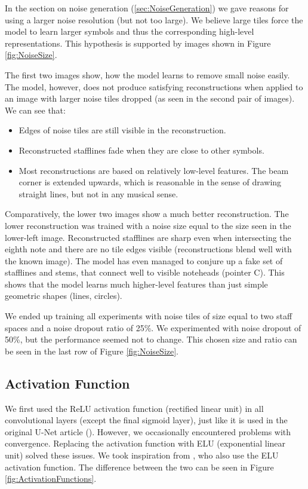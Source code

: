 In the section on noise generation (\ref{sec:NoiseGeneration}) we gave reasons for using a larger noise resolution (but not too large). We believe large tiles force the model to learn larger symbols and thus the corresponding high-level representations. This hypothesis is supported by images shown in Figure \ref{fig:NoiseSize}.

The first two images show, how the model learns to remove small noise easily. The model, however, does not produce satisfying reconstructions when applied to an image with larger noise tiles dropped (as seen in the second pair of images). We can see that:

\begin{itemize}
    \item Edges of noise tiles are still visible in the reconstruction.
    \item Reconstructed stafflines fade when they are close to other symbols.
    \item Most reconstructions are based on relatively low-level features. The beam corner is extended upwards, which is reasonable in the sense of drawing straight lines, but not in any musical sense.
\end{itemize}

Comparatively, the lower two images show a much better reconstruction. The lower reconstruction was trained with a noise size equal to the size seen in the lower-left image. Reconstructed stafflines are sharp even when intersecting the eighth note and there are no tile edges visible (reconstructions blend well with the known image). The model has even managed to conjure up a fake set of stafflines and stems, that connect well to visible noteheads (pointer C). This shows that the model learns much higher-level features than just simple geometric shapes (lines, circles).

We ended up training all experiments with noise tiles of size equal to two staff spaces and a noise dropout ratio of 25\%. We experimented with noise dropout of 50\%, but the performance seemed not to change. This chosen size and ratio can be seen in the last row of Figure \ref{fig:NoiseSize}.


\subsection{Activation Function}
\label{sec:ActivationFunction}

We first used the ReLU activation function (rectified linear unit) in all convolutional layers (except the final sigmoid layer), just like it is used in the original U-Net article (\cite{UNet}). However, we occasionally encountered problems with convergence. Replacing the activation function with ELU (exponential linear unit) solved these issues. We took inspiration from \cite{DorferEtAl}, who also use the ELU activation function. The difference between the two can be seen in Figure \ref{fig:ActivationFunctions}.

